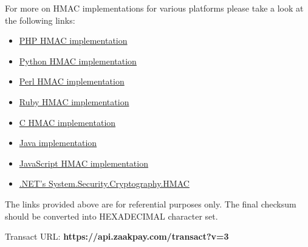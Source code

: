 \documentclass{article}
\begin{document}
For more on HMAC implementations for various platforms please take a look at the following links:
 \begin{itemize}
\item \href{http://www.jokecamp.com/blog/examples-of-creating-base64-hashes-using-hmac-sha256-in-different-languages/#php}{PHP HMAC implementation}
\item \href{http://www.jokecamp.com/blog/examples-of-creating-base64-hashes-using-hmac-sha256-in-different-languages/#python}{Python HMAC implementation}
\item \href{http://www.jokecamp.com/blog/examples-of-creating-base64-hashes-using-hmac-sha256-in-different-languages/#perl}{Perl HMAC implementation}
\item \href{http://www.jokecamp.com/blog/examples-of-creating-base64-hashes-using-hmac-sha256-in-different-languages/#ruby3}{Ruby HMAC implementation}
\item \href{https://gist.github.com/tsupo/112188/acdbf002acf454bd60c355a776b9a5b58b6dff5e}{C HMAC implementation}
\item \href{http://www.jokecamp.com/blog/examples-of-creating-base64-hashes-using-hmac-sha256-in-different-languages/#java}{Java implementation}
\item \href{http://www.jokecamp.com/blog/examples-of-creating-base64-hashes-using-hmac-sha256-in-different-languages/#js}{JavaScript HMAC implementation}
\item \href{http://www.jokecamp.com/blog/examples-of-creating-base64-hashes-using-hmac-sha256-in-different-languages/#csharp}{.NET's System.Security.Cryptography.HMAC}
 \end{itemize}
The links provided above are for referential purposes only. The final checksum should be
converted into HEXADECIMAL character set.

Transact URL: {\bfseries https://api.zaakpay.com/transact?v=3}
\end{document}
